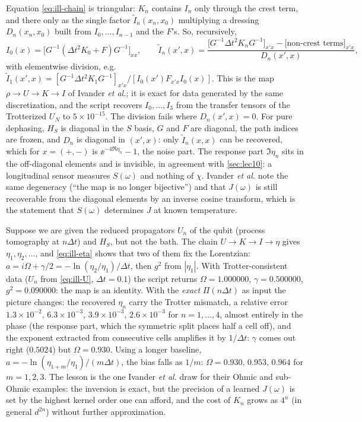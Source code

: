 Equation \eqref{eq:ill-chain} is triangular: $K_n$ contains $I_n$ only through the crest term, and there only as the single factor $\tilde I_n(x_n,x_0)$ multiplying a dressing $D_n(x_n,x_0)$ built from $I_0,\dots,I_{n-1}$ and the $F$'s.
So, recursively,
\begin{equation}
  I_0(x)=\big[G^{-1}(\Delta t^2K_0+F)G^{-1}\big]_{xx},\qquad
  \tilde I_n(x',x)=\frac{\big[G^{-1}\Delta t^2K_nG^{-1}\big]_{x'x}-\big[\text{non-crest terms}\big]_{x'x}}{D_n(x',x)},
  \label{eq:ill-inverse}
\end{equation}
with elementwise division, e.g.\ $\tilde I_1(x',x)=[G^{-1}\Delta t^2K_1G^{-1}]_{x'x}/[I_0(x')F_{x'x}I_0(x)]$.
This is the map $\rho\to U\to K\to I$ of Ivander \emph{et al.}; it is exact for data generated by the same discretization, and the script recovers $I_0,\dots,I_3$ from the transfer tensors of the Trotterized $U_N$ to $5\times10^{-15}$.
The division fails where $D_n(x',x)=0$.
For pure dephasing, $H_S$ is diagonal in the $S$ basis, $G$ and $F$ are diagonal, the path indices are frozen, and $D_n$ is diagonal in $(x',x)$: only $\tilde I_n(x,x)$ can be recovered, which for $x=(+,-)$ is $\ee^{-4\Re\eta_n}-1$, the noise part.
The response part $\Im\eta_n$ sits in the off-diagonal elements and is invisible, in agreement with \cref{sec:lec10}: a longitudinal sensor measures $S(\omega)$ and nothing of $\chi$.
Ivander \emph{et al.} note the same degeneracy (``the map is no longer bijective'') and that $J(\omega)$ is still recoverable from the diagonal elements by an inverse cosine transform, which is the statement that $S(\omega)$ determines $J$ at known temperature.

\begin{exbox}
Suppose we are given the reduced propagators $U_n$ of the qubit (process tomography at $n\Delta t$) and $H_S$, but not the bath.
The chain $U\to K\to I\to\eta$ gives $\eta_1,\eta_2,\dots$, and \cref{eq:ill-eta} shows that two of them fix the Lorentzian: $a=i\Omega+\gamma/2=-\ln(\eta_2/\eta_1)/\Delta t$, then $g^2$ from $|\eta_1|$.
With Trotter-consistent data ($U_n$ from \cref{eq:ill-U}, $\Delta t=0.1$) the script returns $\Omega=1.000000$, $\gamma=0.500000$, $g^2=0.090000$: the map is an identity.
With the \emph{exact} $\Pi(n\Delta t)$ as input the picture changes: the recovered $\eta_n$ carry the Trotter mismatch, a relative error $1.3\times10^{-2},\,6.3\times10^{-3},\,3.9\times10^{-3},\,2.6\times10^{-3}$ for $n=1,\dots,4$, almost entirely in the phase (the response part, which the symmetric split places half a cell off), and the exponent extracted from consecutive cells amplifies it by $1/\Delta t$: $\gamma$ comes out right ($0.5024$) but $\Omega=0.930$.
Using a longer baseline, $a=-\ln(\eta_{1+m}/\eta_1)/(m\Delta t)$, the bias falls as $1/m$: $\Omega=0.930,\,0.953,\,0.964$ for $m=1,2,3$.
The lesson is the one Ivander \emph{et al.} draw for their Ohmic and sub-Ohmic examples: the inversion is exact, but the precision of a learned $J(\omega)$ is set by the highest kernel order one can afford, and the cost of $K_n$ grows as $4^{n}$ (in general $d^{2n}$) without further approximation.
\end{exbox}

